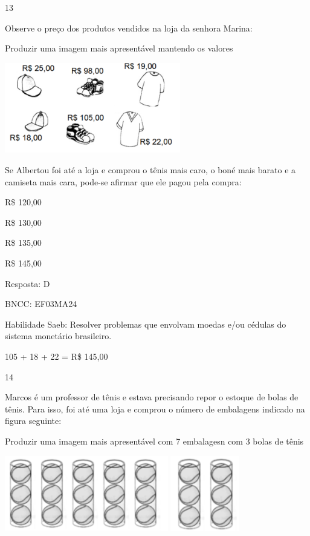 \begin{escolha}
\num{13}

Observe o preço dos produtos vendidos na loja da senhora Marina:

Produzir uma imagem mais apresentável mantendo os valores

\includegraphics[width=3.02451in,height=1.54853in]{media/image138.png}

Se Albertou foi até a loja e comprou o tênis mais caro, o boné mais
barato e a camiseta mais cara, pode-se afirmar que ele pagou pela
compra:

\begin{escolha}

\item
  R\$ 120,00
\item
  R\$ 130,00
\item
  R\$ 135,00
\item
  R\$ 145,00
\end{escolha}

Resposta: D

BNCC: EF03MA24

Habilidade Saeb: Resolver problemas que envolvam moedas e/ou cédulas do
sistema monetário brasileiro.

105 + 18 + 22 = R\$ 145,00

\num{14}

Marcos é um professor de tênis e estava precisando repor o estoque de
bolas de tênis. Para isso, foi até uma loja e comprou o número de
embalagens indicado na figura seguinte:

Produzir uma imagem mais apresentável com 7 embalagesn com 3 bolas de
tênis

\includegraphics[width=2.80882in,height=1.29243in]{media/image139.png}
\includegraphics[width=1.18628in,height=1.28713in]{media/image140.png}


\end{escolha}
